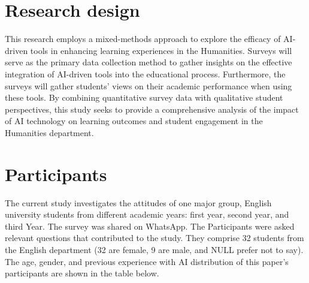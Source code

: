 \section{Research design}
This research employs a mixed-methods approach to explore the efficacy of AI-driven
tools in enhancing learning experiences in the Humanities. Surveys will serve as the
primary data collection method to gather insights on the effective integration of AI-driven
tools into the educational process. Furthermore, the surveys will gather students' views on
their academic performance when using these tools. By combining quantitative survey data with
qualitative student perspectives, this study seeks to provide a comprehensive analysis of the
impact of AI technology on learning outcomes and student engagement in the Humanities department.

\section{Participants}
The current study investigates the attitudes of one major group, English university students
from different academic years: first year, second year, and third Year. The survey was
shared on WhatsApp. The Participants were asked relevant questions that contributed to the study.
They comprise 32 students from the English department (32 are female, 9 are male, and NULL prefer not to say).
The age, gender, and previous experience with AI distribution of this paper’s
participants are shown in the table below.

